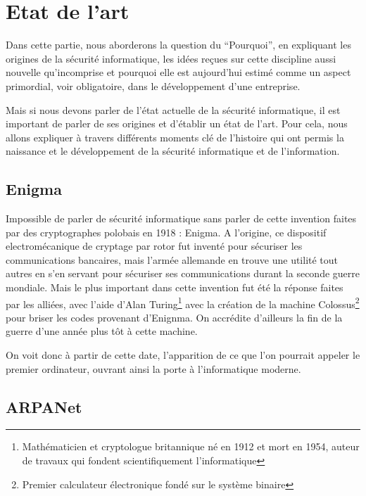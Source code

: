 \documentclass[a4paper]{memoir}
\begin{document}
\chapter{Etat de l'art}%

Dans cette partie, nous aborderons la question du ``Pourquoi'', en expliquant les origines de la sécurité informatique, les idées reçues sur cette discipline aussi nouvelle qu'incomprise et pourquoi elle est aujourd'hui estimé comme un aspect primordial, voir obligatoire, dans le développement d'une entreprise.

\newpage

Mais si nous devons parler de l'état actuelle de la sécurité informatique, il est important de parler de ses origines et d'établir un état de l'art. Pour cela, nous allons expliquer à travers différents moments clé de l'histoire qui ont permis la naissance et le développement de la sécurité informatique et de l'information.

\section{Enigma}

Impossible de parler de sécurité informatique sans parler de cette invention faites par des cryptographes polobais en 1918 : Enigma.
A l'origine, ce dispositif electromécanique de cryptage par rotor fut inventé pour sécuriser les communications bancaires, mais l'armée allemande en trouve une utilité tout autres en s'en servant pour sécuriser ses communications durant la seconde guerre mondiale. Mais le plus important dans cette invention fut été la réponse faites par les alliées, avec l'aide d'Alan Turing\footnote{Mathématicien et cryptologue britannique né en 1912 et mort en 1954, auteur de travaux qui fondent scientifiquement l'informatique} avec la création de la machine Colossus\footnote{Premier calculateur électronique fondé sur le système binaire} pour briser les codes provenant d'Enignma. On accrédite d'ailleurs la fin de la guerre d'une année plus tôt à cette machine.

On voit donc à partir de cette date, l'apparition de ce que l'on pourrait appeler le premier ordinateur, ouvrant ainsi la porte à l'informatique moderne.

\section{ARPANet}
\end{document}
